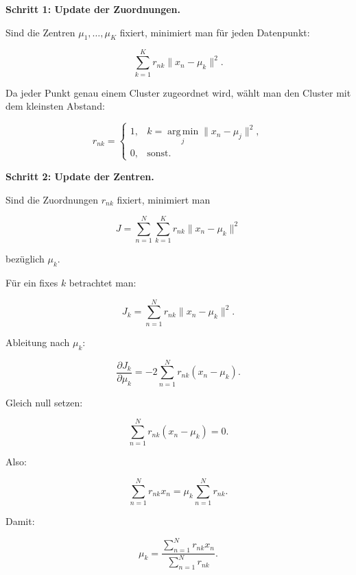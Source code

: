 \documentclass[11pt,a4paper]{scrartcl}
\begin{document}
\begin{calculationbox}
    \textbf{Schritt 1: Update der Zuordnungen.}

    Sind die Zentren \(\mu_1,\dots,\mu_K\) fixiert, minimiert man für jeden
    Datenpunkt:

    \[
        \sum_{k=1}^{K}
        r_{nk}
        \|x_n-\mu_k\|^2.
    \]

    Da jeder Punkt genau einem Cluster zugeordnet wird, wählt man den Cluster
    mit dem kleinsten Abstand:

    \[
        r_{nk}
        =
        \begin{cases}
            1, & k = \operatorname*{arg\,min}_{j}\|x_n-\mu_j\|^2,\\
            0, & \text{sonst}.
        \end{cases}
    \]
\end{calculationbox}

\begin{calculationbox}
    \textbf{Schritt 2: Update der Zentren.}

    Sind die Zuordnungen \(r_{nk}\) fixiert, minimiert man

    \[
        J
        =
        \sum_{n=1}^{N}
        \sum_{k=1}^{K}
        r_{nk}
        \|x_n-\mu_k\|^2
    \]

    bezüglich \(\mu_k\).

    Für ein fixes \(k\) betrachtet man:

    \[
        J_k
        =
        \sum_{n=1}^{N}
        r_{nk}
        \|x_n-\mu_k\|^2.
    \]

    Ableitung nach \(\mu_k\):

    \[
        \frac{\partial J_k}{\partial \mu_k}
        =
        -2
        \sum_{n=1}^{N}
        r_{nk}
        (x_n-\mu_k).
    \]

    Gleich null setzen:

    \[
        \sum_{n=1}^{N}
        r_{nk}
        (x_n-\mu_k)
        =
        0.
    \]

    Also:

    \[
        \sum_{n=1}^{N} r_{nk}x_n
        =
        \mu_k
        \sum_{n=1}^{N} r_{nk}.
    \]

    Damit:

    \[
        \mu_k
        =
        \frac{
            \sum_{n=1}^{N} r_{nk}x_n
        }{
            \sum_{n=1}^{N} r_{nk}
        }.
    \]
\end{calculationbox}
\end{document}
